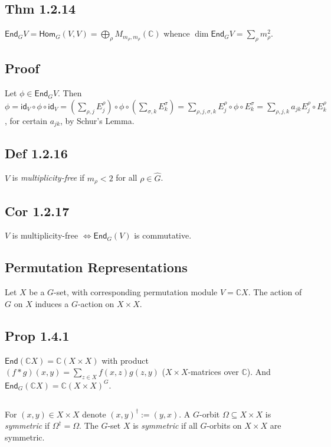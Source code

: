 \documentclass[a4paper]{amsart}
\newcommand{\C}{\mathbb{C}}
\newcommand{\Hom}{\mathsf{Hom}}
\newcommand{\End}{\mathsf{End}}
\newcommand{\id}{\mathsf{id}}
\begin{document}
\subsection{Thm 1.2.14}
$\End_G V = \Hom_G(V, V) = \bigoplus_{\rho} M_{m_{\rho}, m_{\rho}}(\C)$
whence $\dim \End_G V = \sum_{\rho} m_{\rho}^2$.

\subsection{Proof}
 Let $\phi \in \End_G V$.  Then $\phi
 = \id_V \circ \phi \circ \id_V
 = (\sum_{\rho,j} E^{\rho}_j) \circ \phi \circ (\sum_{\sigma,k} E^{\sigma}_k)
 = \sum_{\rho,j,\sigma,k} E^{\rho}_j \circ \phi \circ E^{\sigma}_k
 = \sum_{\rho,j,k} a_{jk} E^{\rho}_j \circ E^{\rho}_k$, for certain $a_{jk}$, by Schur's Lemma.


\subsection{Def 1.2.16}
$V$ is \emph{multiplicity-free} if $m_{\rho} < 2$ for all $\rho \in \hat{G}$.

\subsection{Cor 1.2.17}
$V$ is multiplicity-free $\iff \End_G(V)$ is commutative.


\subsection{Permutation Representations}
Let $X$ be a $G$-set, with corresponding permutation module $V = \C X$.
The action of $G$ on $X$ induces a $G$-action on $X \times X$.

\subsection{Prop 1.4.1}
$\End(\C X) = \C (X \times X)$ with product $(f \ast g)(x, y) =
\sum_{z \in X} f(x, z) g(z, y)$ ($X \times X$-matrices over $\C$).
And
$\End_G(\C X) = \C (X \times X)^G$.
\subsection{}
For $(x, y) \in X \times X$ denote $(x, y)^{\dagger}:= (y, x)$.
A $G$-orbit $\Omega \subseteq X \times X$ is \emph{symmetric}
if $\Omega^{\dagger} = \Omega$.  The $G$-set $X$ is \emph{symmetric} if
all $G$-orbits on $X \times X$ are symmetric.
\end{document}
